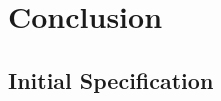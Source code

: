 \documentclass[12pt, a4paper, twoside, onecolumn]{article}
\begin{document}

\section{Conclusion}





\begin{appendices}
  \section{Initial Specification}
  
\end{appendices}
\end{document}
